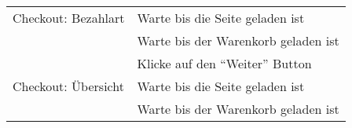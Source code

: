 \begin{table}[H]
\begin{tabularx}{0.9\textwidth}{ | l | X | }
		\multirow{1}{*}{Checkout: Bezahlart} & Warte bis die Seite geladen ist \\ \cline{2-2}
		& Warte bis der Warenkorb geladen ist \\ \cline{2-2}
		& Klicke auf den "`Weiter"' Button \\ \hline
		
		\multirow{1}{*}{Checkout: Übersicht} & Warte bis die Seite geladen ist \\ \cline{2-2}
		& Warte bis der Warenkorb geladen ist \\ \hline
	\end{tabularx} 
\end{table}